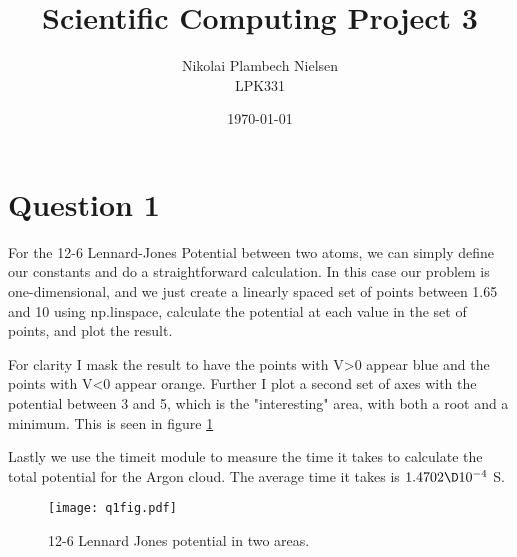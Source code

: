 \documentclass[a4paper,10pt]{article}
\title{Scientific Computing Project 3}
\author{Nikolai Plambech Nielsen\\LPK331}
\date{\today}
\begin{document}
	\maketitle
	
	\section*{Question 1}
	For the 12-6 Lennard-Jones Potential between two atoms, we can simply define our constants and do a straightforward calculation. In this case our problem is one-dimensional, and we just create a linearly spaced set of points between 1.65 and 10 using np.linspace, calculate the potential at each value in the set of points, and plot the result.
	
	For clarity I mask the result to have the points with V>0 appear blue and the points with V<0 appear orange. Further I plot a second set of axes with the potential between 3 and 5, which is the "interesting" area, with both a root and a minimum. This is seen in figure \ref{fig:q1}
	
	Lastly we use the timeit module to measure the time it takes to calculate the total potential for the Argon cloud. The average time it takes is $ 1.4702 \D 10^{-4} $ S.
	\begin{figure}[H]
		\centering
		\texttt{[image: q1fig.pdf]}
		\caption{12-6 Lennard Jones potential in two areas.}
		\label{fig:q1}
	\end{figure}
\end{document}
